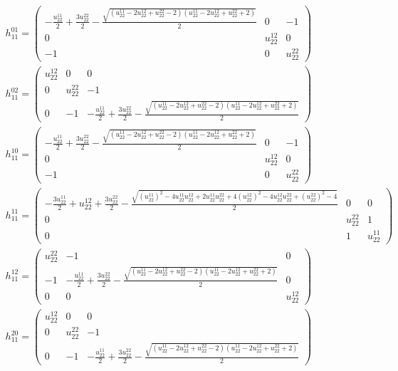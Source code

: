 \documentclass[a4paper, 11pt, twoside, onecolumn]{article}
\begin{document}
\begin{landscape}
\begin{gather*}
	 h_11^{01}=\begin{pmatrix}- \frac{u^{11}_{22}}{2} + \frac{3 u^{22}_{22}}{2} - \frac{\sqrt{\left(u^{11}_{22} - 2 u^{12}_{22} + u^{22}_{22} - 2\right) \left(u^{11}_{22} - 2 u^{12}_{22} + u^{22}_{22} + 2\right)}}{2} & 0 & -1\\0 & u^{12}_{22} & 0\\-1 & 0 & u^{22}_{22}\end{pmatrix}\\ 
	 h_11^{02}=\begin{pmatrix}u^{12}_{22} & 0 & 0\\0 & u^{22}_{22} & -1\\0 & -1 & - \frac{u^{11}_{22}}{2} + \frac{3 u^{22}_{22}}{2} - \frac{\sqrt{\left(u^{11}_{22} - 2 u^{12}_{22} + u^{22}_{22} - 2\right) \left(u^{11}_{22} - 2 u^{12}_{22} + u^{22}_{22} + 2\right)}}{2}\end{pmatrix}\\ 
	 h_11^{10}=\begin{pmatrix}- \frac{u^{11}_{22}}{2} + \frac{3 u^{22}_{22}}{2} - \frac{\sqrt{\left(u^{11}_{22} - 2 u^{12}_{22} + u^{22}_{22} - 2\right) \left(u^{11}_{22} - 2 u^{12}_{22} + u^{22}_{22} + 2\right)}}{2} & 0 & -1\\0 & u^{12}_{22} & 0\\-1 & 0 & u^{22}_{22}\end{pmatrix}\\ 
	 h_11^{11}=\begin{pmatrix}- \frac{3 u^{11}_{22}}{2} + u^{12}_{22} + \frac{3 u^{22}_{22}}{2} - \frac{\sqrt{\left(u^{11}_{22}\right)^{2} - 4 u^{11}_{22} u^{12}_{22} + 2 u^{11}_{22} u^{22}_{22} + 4 \left(u^{12}_{22}\right)^{2} - 4 u^{12}_{22} u^{22}_{22} + \left(u^{22}_{22}\right)^{2} - 4}}{2} & 0 & 0\\0 & u^{22}_{22} & 1\\0 & 1 & u^{11}_{22}\end{pmatrix}\\ 
	 h_11^{12}=\begin{pmatrix}u^{22}_{22} & -1 & 0\\-1 & - \frac{u^{11}_{22}}{2} + \frac{3 u^{22}_{22}}{2} - \frac{\sqrt{\left(u^{11}_{22} - 2 u^{12}_{22} + u^{22}_{22} - 2\right) \left(u^{11}_{22} - 2 u^{12}_{22} + u^{22}_{22} + 2\right)}}{2} & 0\\0 & 0 & u^{12}_{22}\end{pmatrix}\\ 
	 h_11^{20}=\begin{pmatrix}u^{12}_{22} & 0 & 0\\0 & u^{22}_{22} & -1\\0 & -1 & - \frac{u^{11}_{22}}{2} + \frac{3 u^{22}_{22}}{2} - \frac{\sqrt{\left(u^{11}_{22} - 2 u^{12}_{22} + u^{22}_{22} - 2\right) \left(u^{11}_{22} - 2 u^{12}_{22} + u^{22}_{22} + 2\right)}}{2}\end{pmatrix}\\ 

\end{gather*}
\end{landscape}
\end{document}
